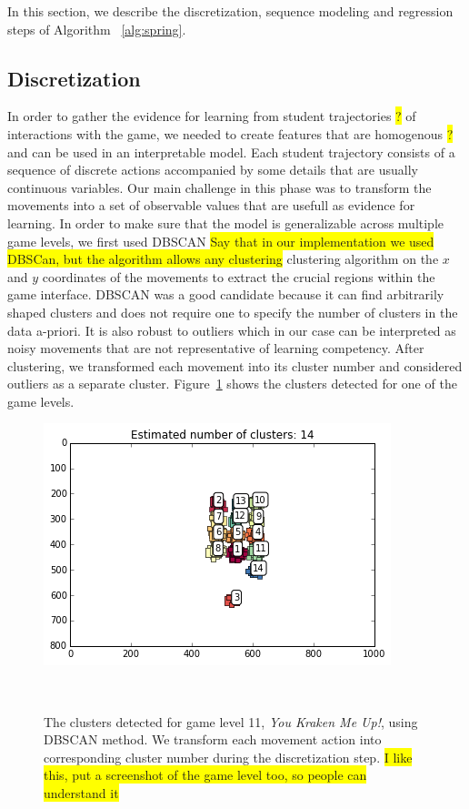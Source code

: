\documentclass{sigchi}
\newcommand{\hl}[1]{\colorbox{yellow}{#1}}
\begin{document}
In this section, we describe  the discretization, sequence modeling and regression steps of Algorithm ~\ref{alg:spring}.


\subsection{Discretization}
	In order to gather the evidence for learning from student trajectories \hl{?} of interactions with the game, we needed to create features that are homogenous \hl{?} and can be used in an interpretable model. 
Each student trajectory consists of a sequence of discrete actions accompanied by some details that are usually continuous variables. 
Our main challenge in this phase was to transform the movements into a set of observable values that are usefull as evidence for learning.
	In order to make sure that the model is generalizable across multiple game levels, we first used DBSCAN \hl{Say that in our implementation we used DBSCan, but the algorithm allows any clustering} clustering algorithm \cite{ester1996density} on the $x$ and $y$ coordinates of the movements to extract the crucial regions within the game interface. 
DBSCAN was a good candidate because it can find arbitrarily shaped clusters and does not require one to specify the number of clusters in the data a-priori. 
It is also robust to outliers which in our case can be interpreted as noisy movements that are not representative of learning competency. 
After clustering, we transformed each movement into its cluster number and considered outliers as a separate cluster. 
Figure~\ref{fig:figurecluster} shows the clusters detected for one of the game levels.

\begin{figure}
	\centering
	\includegraphics[width=0.9\columnwidth]{figures/cluster}
		\caption{The clusters detected for game level 11, \textit {You Kraken Me Up!}, using DBSCAN method. We transform each movement action into corresponding cluster number during the discretization step. \hl{I like this, put a screenshot of the game level too, so people can understand it}}~\label{fig:figurecluster}
\end{figure}
\end{document}
